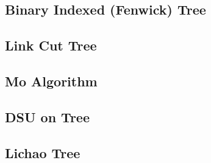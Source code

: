 \subsection{Binary Indexed (Fenwick) Tree}
% 


% 
% 

\subsection{Link Cut Tree}
% 



% 

\subsection{Mo Algorithm}


% 

\subsection{DSU on Tree}


\subsection{Lichao Tree}

% 

